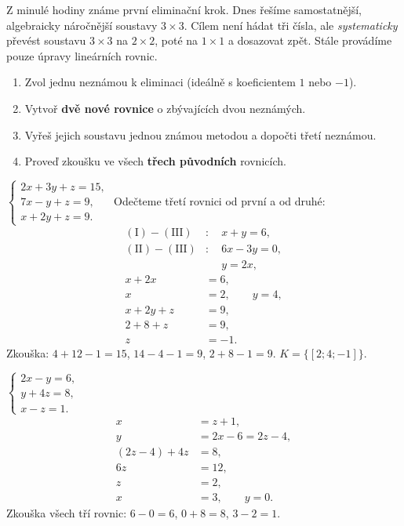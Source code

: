 \documentclass[11pt,a4paper]{article}
\begin{document}
Z minulé hodiny známe první eliminační krok. Dnes řešíme samostatnější, algebraicky náročnější soustavy $3\times3$. Cílem není hádat tři čísla, ale \emph{systematicky} převést soustavu $3\times3$ na $2\times2$, poté na $1\times1$ a dosazovat zpět. Stále provádíme pouze úpravy lineárních rovnic.
\begin{enumerate}[label=\arabic*.]
\item Zvol jednu neznámou k eliminaci (ideálně s koeficientem $1$ nebo $-1$).
\item Vytvoř \textbf{dvě nové rovnice} o zbývajících dvou neznámých.
\item Vyřeš jejich soustavu jednou známou metodou a dopočti třetí neznámou.
\item Proveď zkoušku ve všech \textbf{třech původních} rovnicích.
\end{enumerate}
\begin{prikladReseniBox}[title={Příklad 1}]
$\begin{cases}2x+3y+z=15,\\7x-y+z=9,\\x+2y+z=9.\end{cases}$
\tcblower
Odečteme třetí rovnici od první a od druhé:
\begin{align*}
(\mathrm I)-(\mathrm{III})&:\quad x+y=6,\\
(\mathrm{II})-(\mathrm{III})&:\quad 6x-3y=0,\\
&\phantom{:}\quad y=2x,\\
x+2x&=6,\\
x&=2,\qquad y=4,\\
x+2y+z&=9,\\
2+8+z&=9,\\
z&=-1.
\end{align*}
Zkouška: $4+12-1=15$, $14-4-1=9$, $2+8-1=9$. $K=\{[2;4;-1]\}$.
\end{prikladReseniBox}
\begin{prikladReseniBox}[title={Příklad 2}]
$\begin{cases}2x-y=6,\\y+4z=8,\\x-z=1.\end{cases}$
\tcblower
\begin{align*}
x&=z+1,\\
y&=2x-6=2z-4,\\
(2z-4)+4z&=8,\\
6z&=12,\\
z&=2,\\
x&=3,\qquad y=0.
\end{align*}
Zkouška všech tří rovnic: $6-0=6$, $0+8=8$, $3-2=1$.
\end{prikladReseniBox}
\end{document}
